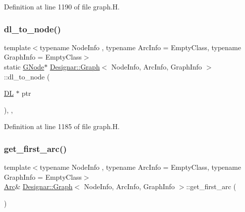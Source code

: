 Definition at line 1190 of file graph.\+H.

\mbox{\label{class_designar_1_1_graph_ab6f1de18d2ec0c537fc1daa5b4a42e01}} 
\subsubsection{\texorpdfstring{dl\+\_\+to\+\_\+node()}{dl\_to\_node()}}
{\footnotesize\ttfamily template$<$typename Node\+Info , typename Arc\+Info  = Empty\+Class, typename Graph\+Info  = Empty\+Class$>$ \\
static \hyperlink{class_designar_1_1_graph_a7e61951db0bb9bfa8a2e317440d4e17f}{G\+Node}$\ast$ \hyperlink{class_designar_1_1_graph}{Designar\+::\+Graph}$<$ Node\+Info, Arc\+Info, Graph\+Info $>$\+::dl\+\_\+to\+\_\+node (\begin{DoxyParamCaption}\item[{\hyperlink{class_designar_1_1_d_l}{DL} $\ast$}]{ptr }\end{DoxyParamCaption})\hspace{0.3cm}{\ttfamily [inline]}, {\ttfamily [static]}, {\ttfamily [protected]}}



Definition at line 1185 of file graph.\+H.

\mbox{\label{class_designar_1_1_graph_a6829f963f0db1fffbc535557f39ed877}} 
\subsubsection{\texorpdfstring{get\+\_\+first\+\_\+arc()}{get\_first\_arc()}\hspace{0.1cm}{\footnotesize\ttfamily [1/2]}}
{\footnotesize\ttfamily template$<$typename Node\+Info , typename Arc\+Info  = Empty\+Class, typename Graph\+Info  = Empty\+Class$>$ \\
\hyperlink{class_designar_1_1_graph_a74c730ef4ce2d20f998d72bd25c2b5bf}{Arc}\& \hyperlink{class_designar_1_1_graph}{Designar\+::\+Graph}$<$ Node\+Info, Arc\+Info, Graph\+Info $>$\+::get\+\_\+first\+\_\+arc (\begin{DoxyParamCaption}{ }\end{DoxyParamCaption})\hspace{0.3cm}{\ttfamily [inline]}}



